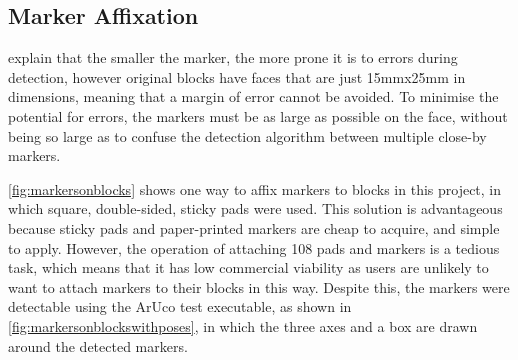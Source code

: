 \subsection{Marker Affixation}\label{sec:markeraffixation}

\citet{arucopaper} explain that the smaller the marker, the more prone it is to errors during detection, however original \jenga{} blocks have faces that are just 15mmx25mm in dimensions, meaning that a margin of error cannot be avoided. To minimise the potential for errors, the markers must be as large as possible on the face, without being so large as to confuse the detection algorithm between multiple close-by markers.

\cref{fig:markersonblocks} shows one way to affix markers to blocks in this project, in which square, double-sided, sticky pads were used. This solution is advantageous because sticky pads and paper-printed markers are cheap to acquire, and simple to apply. However, the operation of attaching 108 pads and markers is a tedious task, which means that it has low commercial viability as users are unlikely to want to attach markers to their blocks in this way. Despite this, the markers were detectable using the ArUco test executable, as shown in \cref{fig:markersonblockswithposes}, in which the three axes and a box are drawn around the detected markers.


